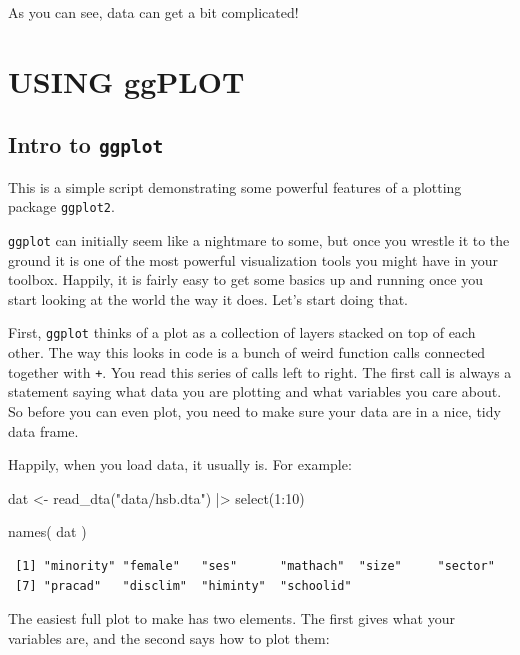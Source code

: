 \documentclass[
  letterpaper,
  DIV=11,
  numbers=noendperiod]{scrreprt}
\newenvironment{Shaded}{\begin{snugshade}}{\end{snugshade}}
\newcommand{\DecValTok}[1]{\textcolor[rgb]{0.25,0.63,0.44}{#1}}
\newcommand{\FunctionTok}[1]{\textcolor[rgb]{0.02,0.16,0.49}{#1}}
\newcommand{\NormalTok}[1]{\textcolor[rgb]{0.00,0.44,0.13}{#1}}
\newcommand{\OtherTok}[1]{\textcolor[rgb]{0.00,0.44,0.13}{#1}}
\newcommand{\SpecialCharTok}[1]{\textcolor[rgb]{0.25,0.44,0.63}{#1}}
\newcommand{\StringTok}[1]{\textcolor[rgb]{0.25,0.44,0.63}{#1}}
\begin{document}
As you can see, data can get a bit complicated!

\part{USING ggPLOT}

\hypertarget{intro-to-ggplot}{%
\chapter{\texorpdfstring{Intro to
\texttt{ggplot}}{Intro to ggplot}}\label{intro-to-ggplot}}

This is a simple script demonstrating some powerful features of a
plotting package \texttt{ggplot2}.

\texttt{ggplot} can initially seem like a nightmare to some, but once
you wrestle it to the ground it is one of the most powerful
visualization tools you might have in your toolbox. Happily, it is
fairly easy to get some basics up and running once you start looking at
the world the way it does. Let's start doing that.

First, \texttt{ggplot} thinks of a plot as a collection of layers
stacked on top of each other. The way this looks in code is a bunch of
weird function calls connected together with \texttt{+}. You read this
series of calls left to right. The first call is always a statement
saying what data you are plotting and what variables you care about. So
before you can even plot, you need to make sure your data are in a nice,
tidy data frame.

Happily, when you load data, it usually is. For example:

\begin{Shaded}
\begin{Highlighting}[]
\NormalTok{dat }\OtherTok{\textless{}{-}} \FunctionTok{read\_dta}\NormalTok{(}\StringTok{"data/hsb.dta"}\NormalTok{) }\SpecialCharTok{|\textgreater{}} 
  \FunctionTok{select}\NormalTok{(}\DecValTok{1}\SpecialCharTok{:}\DecValTok{10}\NormalTok{)}

\FunctionTok{names}\NormalTok{( dat )}
\end{Highlighting}
\end{Shaded}

\begin{verbatim}
 [1] "minority" "female"   "ses"      "mathach"  "size"     "sector"  
 [7] "pracad"   "disclim"  "himinty"  "schoolid"
\end{verbatim}

The easiest full plot to make has two elements. The first gives what
your variables are, and the second says how to plot them:
\end{document}

